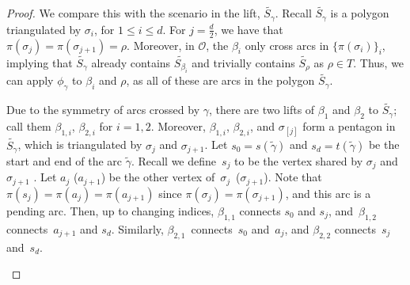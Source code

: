 \begin{proof}
We compare this with the scenario in the lift, $\widetilde{S_\gamma}$. Recall $\widetilde{S_\gamma}$ is a polygon triangulated by $\sigma_i$, for $1 \leq i \leq d$. For $j = \frac{d}{2}$, we have that $\pi(\sigma_j) = \pi(\sigma_{j+1}) = \rho$. Moreover, in $\mathcal{O}$, the $\beta_i$ only cross arcs in $\{\pi(\sigma_i)\}_i$, implying that $\widetilde{S_\gamma}$ already contains $\widetilde{S_{\beta_i}}$ and trivially contains $\widetilde{S_\rho}$ as $\rho \in T$. Thus, we can apply $\phi_\gamma$ to $\beta_i$ and $\rho$, as all of these are arcs in the polygon $\widetilde{S_\gamma}$.

 Due to the symmetry of arcs crossed by $\gamma$, there are two lifts of $\beta_1$ and $\beta_2$ to $\widetilde{S_\gamma}$; call them $\beta_{1,i}$, $\beta_{2,i}$ for $i = 1,2$. Moreover, $\beta_{1,i}$, $\beta_{2,i}$, and $\sigma_{[j]}$ form a pentagon in $\widetilde{S_\gamma}$, which is triangulated by $\sigma_j$ and $\sigma_{j+1}$. Let $s_0 = s(\widetilde{\gamma})$ and $s_d = t(\widetilde{\gamma})$ be the start and end of the arc $\widetilde{\gamma}$. Recall we define~$s_j$ to be the vertex shared by $\sigma_j$ and $\sigma_{j+1}$ . Let $a_j$ ($a_{j+1}$) be the other vertex of~$\sigma_j$~($\sigma_{j+1}$). Note that $\pi(s_j) = \pi(a_j) = \pi(a_{j+1})$ since $\pi(\sigma_j) = \pi(\sigma_{j+1})$, and this arc is a pending arc. Then, up to changing indices, $\beta_{1,1}$ connects $s_0$ and $s_j$, and~$\beta_{1,2}$ connects~$a_{j+1}$ and $s_d$. Similarly, $\beta_{2,1}$~connects~$s_0$ and~$a_j$, and $\beta_{2,2}$ connects~$s_j$ and~$s_d$.

\begin{center}
\end{center}


\end{proof}
